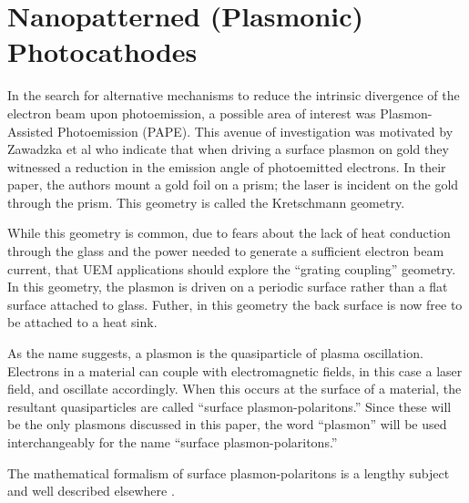 
\section{Nanopatterned (Plasmonic) Photocathodes}

In the search for alternative mechanisms to reduce the intrinsic divergence of the electron beam upon photoemission, a possible area of interest was Plasmon-Assisted Photoemission (PAPE). 
This avenue of investigation was motivated by Zawadzka et al \cite{zawadzka_evanescent_2001} who indicate that when driving a surface plasmon on gold they witnessed a reduction in the emission angle of photoemitted electrons.
In their paper, the authors mount a gold foil on a prism; the laser is incident on the gold through the prism.
This geometry is called the Kretschmann geometry.

While this geometry is common, due to fears about the lack of heat conduction through the glass and the power needed to generate a sufficient electron beam current, that UEM applications should explore the ``grating coupling'' geometry.
In this geometry, the plasmon is driven on a periodic surface rather than a flat surface attached to glass.
Futher, in this geometry the back surface is now free to be attached to a heat sink.


As the name suggests, a plasmon is the quasiparticle of plasma oscillation.
Electrons in a material can couple with electromagnetic fields, in this case a laser field, and oscillate accordingly.
When this occurs at the surface of a material, the resultant quasiparticles are called ``surface plasmon-polaritons.''
Since these will be the only plasmons discussed in this paper, the word ``plasmon'' will be used interchangeably for the name ``surface plasmon-polaritons.''

The mathematical formalism of surface plasmon-polaritons is a lengthy subject and well described elsewhere \cite{cottam_introduction_2004,concepts_2002}.


